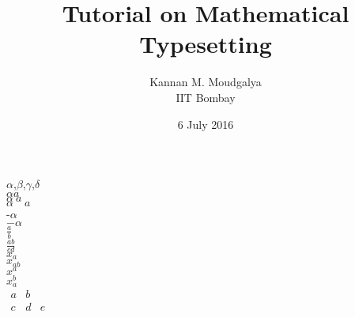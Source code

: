 \documentclass[12pt,a5paper]{article}
\title{Tutorial on Mathematical Typesetting}
\author{Kannan M. Moudgalya \\ IIT Bombay}
\date{6 July 2016}
\begin{document}
\maketitle

$\alpha$,$\beta$,$\gamma$,$\delta$ \\

$\alpha a$ \\
$\alpha \ a$ \\
$\alpha \quad a$  \\

-$\alpha$ \\
$-\alpha$  \\

$\frac a b$ \\
$\frac{ab}{cd}$ \\

$x_a$ \\
$x_{ab}$ \\
$x^a$ \\
$x_a^b$ \\  

$\begin{matrix}
a & b \\
c & d & e
\end{matrix}$ \\
\end{document}

